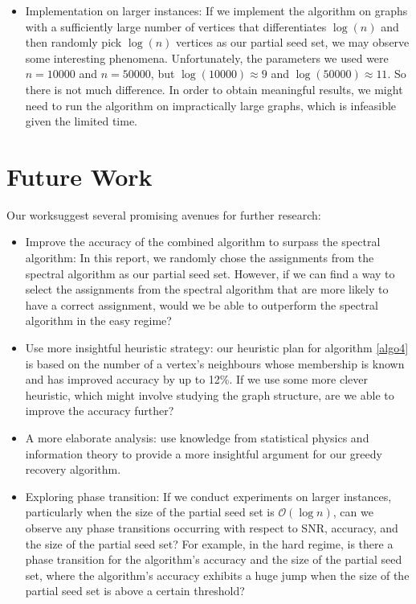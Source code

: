 \begin{itemize}
    \item Implementation on larger instances: If we implement the algorithm on graphs with a sufficiently large number of vertices that differentiates $\log(n)$ and then randomly pick $\log(n)$ vertices as our partial seed set, we may observe some interesting phenomena. Unfortunately, the parameters we used were $n=10000$ and $n=50000$, but $\log(10000) \approx 9$ and $\log(50000) \approx 11$. So there is not much difference. In order to obtain meaningful results, we might need to run the algorithm on impractically large graphs, which is infeasible given the limited time.
\end{itemize}
\section{Future Work}
Our worksuggest several promising avenues for further research:
\begin{itemize}
    \item  Improve the accuracy of the combined algorithm to surpass the spectral algorithm: In this report, we randomly chose the assignments from the spectral algorithm as our partial seed set. However, if we can find a way to select the assignments from the spectral algorithm that are more likely to have a correct assignment, would we be able to outperform the spectral algorithm in the easy regime?
    \item Use more insightful heuristic strategy: our heuristic plan for algorithm \ref{algo4} is based on the number of a vertex's neighbours whose membership is known and has improved accuracy by up to 12\%. If we use some more clever heuristic, which might involve studying the graph structure, are we able to improve the accuracy further?
    \item A more elaborate analysis: use knowledge from statistical physics and information theory to provide a more insightful argument for our greedy recovery algorithm.
    \item Exploring phase transition: If we conduct experiments on larger instances, particularly when the size of the partial seed set is $\mathcal{O}(\log n)$, can we observe any phase transitions occurring with respect to SNR, accuracy, and the size of the partial seed set? For example, in the hard regime, is there a phase transition for the algorithm's accuracy and the size of the partial seed set, where the algorithm's accuracy exhibits a huge jump when the size of the partial seed set is above a certain threshold?
\end{itemize}
